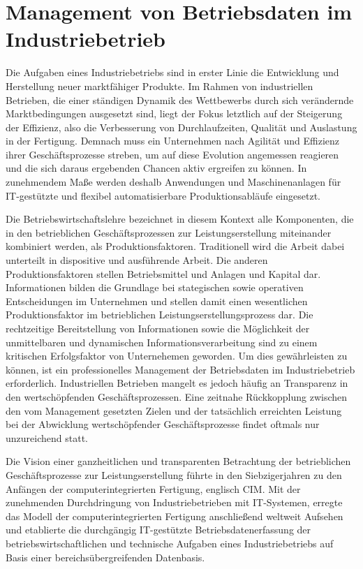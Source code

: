 \section{Management von Betriebsdaten im Industriebetrieb}\label{sec:usecase}
Die Aufgaben eines Industriebetriebs sind in erster Linie die Entwicklung und Herstellung neuer marktfähiger Produkte. 
Im Rahmen von industriellen Betrieben, die einer ständigen Dynamik des Wettbewerbs durch sich verändernde Marktbedingungen ausgesetzt sind, liegt der Fokus letztlich auf der Steigerung der Effizienz, also die Verbesserung von Durchlaufzeiten, Qualität und Auslastung in der Fertigung.
\cite{Erlach.2010}
Demnach muss ein Unternehmen nach Agilität und Effizienz ihrer Geschäftsprozesse streben, um auf diese Evolution angemessen reagieren und die sich daraus ergebenden Chancen aktiv ergreifen zu können.
 In zunehmendem Maße werden deshalb Anwendungen und Maschinenanlagen für \ac{IT}-gestützte und flexibel automatisierbare Produktionsabläufe eingesetzt. 
\cite{Erlach.2010}

Die Betriebswirtschaftslehre bezeichnet in diesem Kontext alle Komponenten, die in den betrieblichen Geschäftsprozessen zur Leistungserstellung miteinander kombiniert werden, als Produktionsfaktoren. 
Traditionell wird die Arbeit dabei unterteilt in dispositive und ausführende Arbeit. Die anderen Produktionsfaktoren stellen Betriebsmittel und Anlagen und Kapital dar.
\cite{Kanel.2018}
Informationen bilden die Grundlage bei stategischen sowie operativen Entscheidungen im Unternehmen und stellen damit einen wesentlichen Produktionsfaktor im betrieblichen Leistungserstellungsprozess dar.
\cite{Scheer.1990}
Die rechtzeitige Bereitstellung von Informationen sowie die Möglichkeit der unmittelbaren und dynamischen Informationsverarbeitung sind zu einem kritischen Erfolgsfaktor von Unternehemen geworden. 
Um dies gewährleisten zu können, ist ein professionelles Management der Betriebsdaten im Industriebetrieb erforderlich.
\cite{Dippold.2005}
Industriellen Betrieben mangelt es jedoch häufig an Transparenz in den wertschöpfenden Geschäftsprozessen.
Eine zeitnahe Rückkopplung zwischen den vom Management gesetzten Zielen und der tatsächlich erreichten Leistung bei der Abwicklung wertschöpfender Geschäftsprozesse findet oftmals nur unzureichend statt. 
\cite{Grauer.2019}

Die Vision einer ganzheitlichen und transparenten Betrachtung der betrieblichen Geschäftsprozesse zur Leistungserstellung führte in den Siebzigerjahren zu den Anfängen der computerintegrierten Fertigung, englisch \acf{CIM}. 
Mit der zunehmenden Durchdringung von Industriebetrieben mit \ac{IT}-Systemen, erregte das Modell der computerintegrierten Fertigung anschließend weltweit Aufsehen und etablierte die durchgängig \ac{IT}-gestützte Betriebsdatenerfassung der betriebswirtschaftlichen und technische Aufgaben eines Industriebetriebs auf Basis einer bereichsübergreifenden Datenbasis.
\citeauthor{Scheer.1990}



